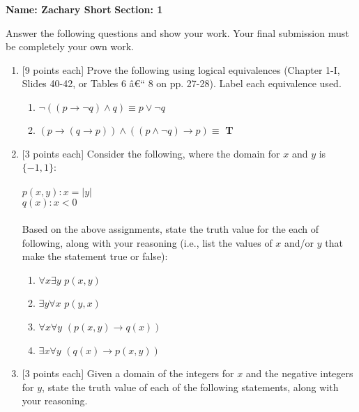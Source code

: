 \documentclass[11pt]{article}
\begin{document}
{\bf Name: Zachary Short}
\hspace{10.75cm}
{\bf Section: 1}

\vskip 0.5cm
Answer the following questions and show your work.  Your final submission must be completely your own work.
\begin{enumerate}
\item {[9 points each]}  Prove the following using logical equivalences (Chapter 1-I, Slides 40-42, or Tables 6 â€“ 8 on pp. 27-28).  
Label each equivalence used. 

\begin{enumerate}[label=\alph*.]
\itemsep-0mm
\item $\neg ((p \rightarrow \neg q) \wedge q) \equiv p \vee \neg q$
\item $(p \rightarrow (q \rightarrow p)) \wedge ((p \wedge \neg q) \rightarrow p) \equiv$ {\bf T}
\end{enumerate}

\vskip 0.5cm
\item {[3 points each]}  Consider the following, where the domain for $x$ and $y$ is $\{-1, 1\}$:\\
\\ \hspace*{2cm} $p(x,y): x = |y|$
\\ \hspace*{2cm} $q(x): x < 0$ \\
\\ Based on the above assignments, state the truth value for the each of following, along with your reasoning 
(i.e., list the values of $x$ and/or $y$ that make the statement true or false):
\begin{enumerate}[label=\alph*.]
\itemsep-0mm
\item $\forall x \exists y$ $p(x, y)$
\item $\exists y \forall x$ $p(y, x)$
\item $\forall x \forall y$ $(p(x, y) \rightarrow q(x))$
\item $\exists x \forall y$ $(q(x) \rightarrow p(x, y))$
\end{enumerate}

\vskip 0.5cm
\item {[3 points each]}  Given a domain of the integers for $x$ and the negative integers for $y$, 
state the truth value of each of the following statements, along with your reasoning.


\end{enumerate}
\end{document}
